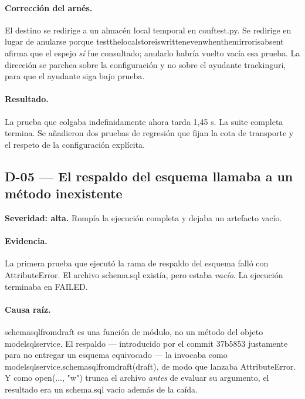 \documentclass[11pt,a4paper]{article}
\newcommand{\code}[1]{{\ttfamily\small\def\_{\textunderscore\allowbreak}#1}}
\begin{document}
\paragraph{Corrección del arnés.} El destino se redirige a un almacén local temporal en
\code{conftest.py}. Se redirige en lugar de anularse porque
\code{test\_the\_local\_store\_is\_written\_even\_when\_the\_mirror\_is\_absent} afirma que el
espejo \emph{sí} fue consultado; anularlo habría vuelto vacía esa prueba. La dirección se
parchea sobre la configuración y no sobre el ayudante \code{\_tracking\_uri}, para que el
ayudante siga bajo prueba.

\paragraph{Resultado.} La prueba que colgaba indefinidamente ahora tarda 1{,}45 s. La suite
completa termina. Se añadieron dos pruebas de regresión que fijan la cota de transporte y el
respeto de la configuración explícita.

\subsection*{D-05 --- El respaldo del esquema llamaba a un método inexistente}

\begin{finding}
\textbf{Severidad: alta.} Rompía la ejecución completa y dejaba un artefacto vacío.
\end{finding}

\paragraph{Evidencia.} La primera prueba que ejecutó la rama de respaldo del esquema falló
con \code{AttributeError}. El archivo \code{schema.sql} existía, pero estaba \emph{vacío}.
La ejecución terminaba en \code{FAILED}.

\paragraph{Causa raíz.} \code{schema\_sql\_from\_draft} es una función de módulo, no un
método del objeto \code{model\_sql\_service}. El respaldo --- introducido por el commit
\code{37b5853} justamente para no entregar un esquema equivocado --- la invocaba como
\code{model\_sql\_service.schema\_sql\_from\_draft(draft)}, de modo que lanzaba
\code{AttributeError}. Y como \code{open(..., "w")} trunca el archivo \emph{antes} de
evaluar su argumento, el resultado era un \code{schema.sql} vacío además de la caída.
\end{document}
